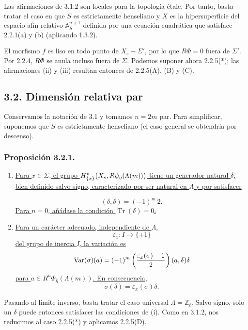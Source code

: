 Las afirmaciones de 3.1.2 son locales para la topología étale. Por
tanto, basta tratar el caso en que $S$ es estrictamente henseliano y
$X$ es la hipersuperficie del espacio afín relativo
$\mathbb A^{n+1}_S$ definida por una ecuación cuadrática que satisface
2.2.1(a) y (b) (aplicando 1.3.2).

El morfismo $f$ es liso en todo punto de $X_s-\Sigma'$, por lo que
$R\Phi=0$ fuera de $\Sigma'$. Por 2.2.4, $R\Phi$ se anula incluso fuera
de $\Sigma$. Podemos suponer ahora 2.2.5(*); las afirmaciones (ii) y
(iii) resultan entonces de 2.2.5(A), (B) y (C).

\subsection*{3.2. Dimensión relativa par}

Conservamos la notación de 3.1 y tomamos $n=2m$ par. Para simplificar,
suponemos que $S$ es estrictamente henseliano (el caso general se
obtendría por descenso).

\subsubsection*{Proposición 3.2.1.}
\begin{enumerate}
\item[(i)] \underline{Para $x\in\Sigma$, el grupo
$H^n_{\{x\}}\bigl(
\sisi{R^n\psi_{\bar\eta}(\Lambda(m))}
{X_s,R\psi_{\bar\eta}(\Lambda(m))}\sisi{}{\bigr)}$ tiene un generador natural
$\delta$, bien definido salvo signo, caracterizado por ser natural en
$\Lambda$ y por satisfacer}

\pageoriginale

\[
(\delta,\delta)=(-1)^m\,2.
\]
\underline{Para $n=0$, añádase la condición
$\operatorname{Tr}(\delta)=0$.}

\item[(ii)] \underline{Para un carácter adecuado, independiente de
$\Lambda$,}
\[
\varepsilon_x:I\longrightarrow\{\pm1\}
\]
\underline{del grupo de inercia $I$, la variación es}
\[
\operatorname{Var}(\sigma)(a)
=(-1)^m\left(\frac{\varepsilon_x(\sigma)-1}{2}\right)
\sisi{(a\delta)}{(a,\delta)}\delta
\]
\underline{para $a\in R^n\Phi_{\bar\eta}(\Lambda(m))$. En
consecuencia,}
\[
\sigma(\delta)=\varepsilon_x(\sigma)\delta.
\]
\end{enumerate}

Pasando al límite inverso, basta tratar el caso universal
$\Lambda=\mathbb Z_\ell$. Salvo signo, solo un $\delta$ puede entonces
satisfacer las condiciones de (i). Como en 3.1.2, nos reducimos al caso
2.2.5(*) y aplicamos 2.2.5(D).

